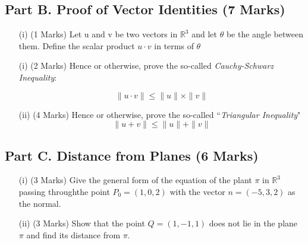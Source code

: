 \documentclass[a4paper,12pt]{article}
\begin{document}
	\subsection*{Part B. Proof of Vector Identities (7 Marks)}
	\begin{itemize}
		\item[(i)] (1 Marks) Let u and v be two vectors in $\mathbb{R}^3$ and let $\theta$ be the angle between them. Define the scalar product $u \cdot v$ in terms of $\theta$ 
		\item[(i)] (2 Marks) Hence or otherwise, prove the so-called \textit{Cauchy-Schwarz Inequality}:
		
		\[ \|u \cdot v \|  \leq \|u \|\times \| v \|  \]
		\item[(ii)] (4 Marks) Hence or otherwise, prove the so-called ``\textit{Triangular Inequality}"
		\[ \|u + v\|  \leq  \|u \| +  \| v \| \]
		
%		
	\end{itemize}
	
	


\subsection*{Part C. Distance from Planes (6 Marks)}	

\begin{itemize}
	\item[(i)] (3 Marks) Give the general form of the equation of the plant $\pi$ in $\mathbb{R}^3$ passing throughthe point $P_0 =(1,0,2)$ with the vector $n=(-5,3,2)$ as the normal.
	
	
	\item[(ii)] (3 Marks) Show that the point $Q=(1,-1,1)$ does not lie in the plane $\pi$ and find its distance from $\pi$.
\end{itemize}
\end{document}
